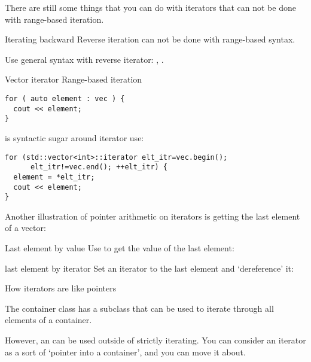 
There are still some things that you can do with iterators that
can not be done with range-based iteration.

\begin{block}{Iterating backward}
  \label{sl:reverse-iterator}
  Reverse iteration can not be done with range-based syntax.
  
  Use general syntax with reverse iterator: ,
  .
\end{block}

\begin{slide}{Vector iterator}
  \label{sl:iterate-vector}
  Range-based iteration
\begin{lstlisting}
for ( auto element : vec ) {
  cout << element;
}
\end{lstlisting}
 is syntactic sugar around iterator use:
\begin{lstlisting}
for (std::vector<int>::iterator elt_itr=vec.begin();
      elt_itr!=vec.end(); ++elt_itr) {
  element = *elt_itr;
  cout << element;
}
\end{lstlisting}
\end{slide}

Another illustration of pointer arithmetic on iterators is getting the
last element of a vector:

\begin{block}{Last element by value}
  Use  to get the value of the last element:
\end{block}

\begin{block}{last element by iterator}
  Set an iterator to the last element and `dereference' it:
\end{block}

 {How iterators are like pointers}
\label{sec:iterator-class}

The container class has a subclass  that can be
used to iterate through all elements of a container. 

However, an  can be used outside of strictly iterating.
You can consider an iterator as a sort of `pointer into a container',
and you can move it about.

